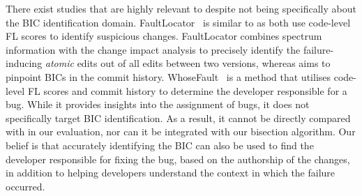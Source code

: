 There exist studies that are highly relevant to \name despite not being specifically about the BIC identification domain. FaultLocator~\cite{zhang2011localizing} is similar to \name as both use
code-level FL scores to identify suspicious changes. FaultLocator combines spectrum information with the change impact
analysis to precisely identify the failure-inducing \emph{atomic} edits out
of all edits between two versions, whereas \name aims to pinpoint BICs in the
commit history. WhoseFault~\cite{Servant2012} is a method that utilises code-level FL scores and commit history to determine the developer responsible for a bug. While it provides insights into the assignment of bugs, it does not specifically target BIC identification. As a result, it cannot be directly compared with \name in our evaluation, nor can it be integrated with our bisection algorithm. Our belief is that accurately identifying the BIC can also be used to find the developer responsible for fixing the bug, based on the authorship of the changes, in addition to helping developers understand the context in which the failure occurred.








